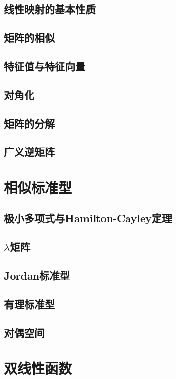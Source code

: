 \documentclass[openany]{book}
\begin{document}
\section{线性映射的基本性质}

\section{矩阵的相似}
\section{特征值与特征向量}%
\section{对角化}
\section{矩阵的分解}
\section{广义逆矩阵}

\chapter{相似标准型}
\section{极小多项式与Hamilton-Cayley定理}
\section{$\lambda$矩阵}
\section{Jordan标准型}
\section{有理标准型}
\section{对偶空间}

\chapter{双线性函数} %
\end{document}
